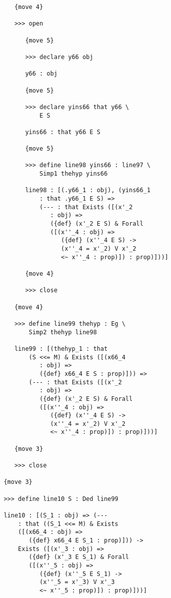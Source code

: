 \documentclass{article}
\begin{document}
\begin{verbatim}
            {move 4}

            >>> open

               {move 5}

               >>> declare y66 obj

               y66 : obj

               {move 5}

               >>> declare yins66 that y66 \
                   E S

               yins66 : that y66 E S

               {move 5}

               >>> define line98 yins66 : line97 \
                   Simp1 thehyp yins66

               line98 : [(.y66_1 : obj), (yins66_1 
                   : that .y66_1 E S) => 
                   (--- : that Exists ([(x'_2 
                      : obj) => 
                      ({def} (x'_2 E S) & Forall 
                      ([(x''_4 : obj) => 
                         ({def} (x''_4 E S) -> 
                         (x''_4 = x'_2) V x'_2 
                         <~ x''_4 : prop)]) : prop)]))]

               {move 4}

               >>> close

            {move 4}

            >>> define line99 thehyp : Eg \
                Simp2 thehyp line98

            line99 : [(thehyp_1 : that 
                (S <<= M) & Exists ([(x66_4 
                   : obj) => 
                   ({def} x66_4 E S : prop)])) => 
                (--- : that Exists ([(x'_2 
                   : obj) => 
                   ({def} (x'_2 E S) & Forall 
                   ([(x''_4 : obj) => 
                      ({def} (x''_4 E S) -> 
                      (x''_4 = x'_2) V x'_2 
                      <~ x''_4 : prop)]) : prop)]))]

            {move 3}

            >>> close

         {move 3}

         >>> define line10 S : Ded line99

         line10 : [(S_1 : obj) => (--- 
             : that ((S_1 <<= M) & Exists 
             ([(x66_4 : obj) => 
                ({def} x66_4 E S_1 : prop)])) -> 
             Exists ([(x'_3 : obj) => 
                ({def} (x'_3 E S_1) & Forall 
                ([(x''_5 : obj) => 
                   ({def} (x''_5 E S_1) -> 
                   (x''_5 = x'_3) V x'_3 
                   <~ x''_5 : prop)]) : prop)]))]


\end{verbatim}
\end{document}
